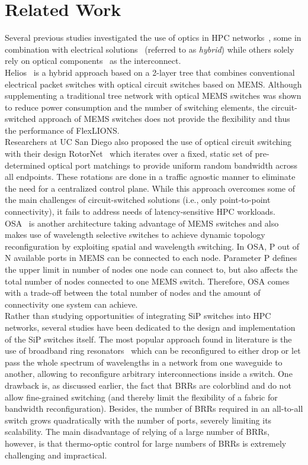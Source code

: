 \section{Related Work}
Several previous studies investigated the use of optics in HPC networks~\cite{perello2013all}, some in combination with electrical solutions~\cite{Farrington2010Helios}\cite{Wang2010cthrough} (referred to as \textit{hybrid}) while others solely rely on optical components~\cite{Mellette2017RotorNet}\cite{Chen2014OSA} as the interconnect. \\
Helios~\cite{Farrington2010Helios} is a hybrid approach based on a 2-layer tree that combines conventional electrical packet switches with optical circuit switches based on MEMS. Although supplementing a traditional tree network with optical MEMS switches was shown to reduce power consumption and the number of switching elements, the circuit-switched approach of MEMS switches does not provide the flexibility and thus the performance of FlexLIONS. \\
Researchers at UC San Diego also proposed the use of optical circuit switching with their design RotorNet~\cite{Mellette2017RotorNet} which iterates over a fixed, static set of pre-determined optical port matchings to provide uniform random bandwidth across all endpoints. These rotations are done in a traffic agnostic manner to eliminate the need for a centralized control plane. While this approach overcomes some of the main challenges of circuit-switched solutions (i.e., only point-to-point connectivity), it fails to address needs of latency-sensitive HPC workloads. \\ 
OSA~\cite{Chen2014OSA} is another architecture taking advantage of MEMS switches and also makes use of wavelength selective switches to achieve dynamic topology reconfiguration by exploiting spatial and wavelength switching. In OSA, P out of N available ports in MEMS can be connected to each node. Parameter P defines the upper limit in number of nodes one node can connect to, but also affects the total number of nodes connected to one MEMS switch. Therefore, OSA comes with a trade-off between the total number of nodes and the amount of connectivity one system can achieve.\\
Rather than studying opportunities of integrating SiP switches into HPC networks, several studies have been dedicated to the design and implementation of the SiP switches itself. The most popular approach found in literature is the use of broadband ring resonators~\cite{DasMahapatra2014BroadMR}\cite{nikolova2017modular} which can be reconfigured to either drop or let pass the whole spectrum of wavelengths in a network from one waveguide to another, allowing to reconfigure arbitrary interconnections inside a switch. One  drawback is, as discussed earlier, the fact that BRRs are colorblind and do not allow fine-grained switching (and thereby limit the flexibility of a fabric for bandwidth reconfiguration). Besides, the number of BRRs required in an all-to-all switch grows quadratically with the number of ports, severely limiting its scalability. The main disadvantage of relying of a large number of BRRs, however, is that thermo-optic control for large numbers of BRRs is extremely challenging and impractical. \\

